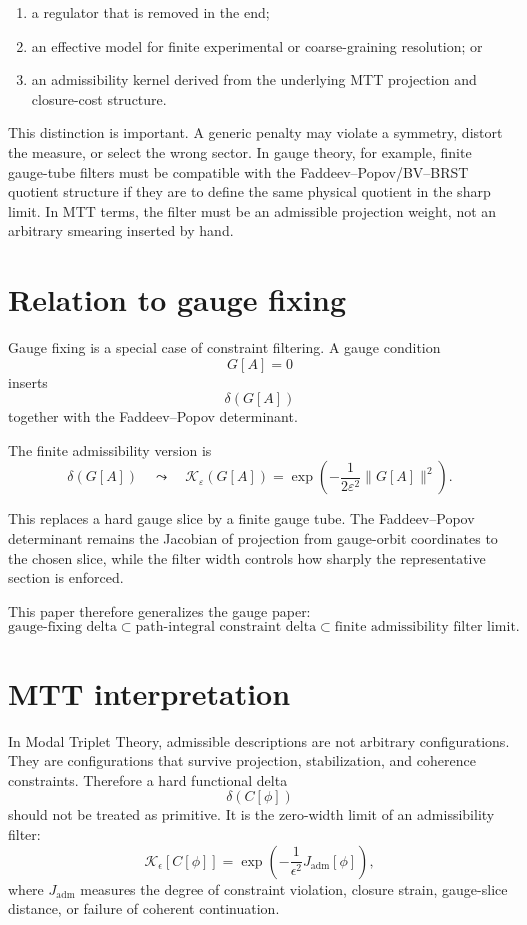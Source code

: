 \documentclass[11pt]{article}
\begin{document}
\begin{enumerate}
\item a regulator that is removed in the end;
\item an effective model for finite experimental or coarse-graining resolution; or
\item an admissibility kernel derived from the underlying MTT projection and closure-cost
structure.
\end{enumerate}

This distinction is important.  A generic penalty may violate a symmetry, distort the measure,
or select the wrong sector.  In gauge theory, for example, finite gauge-tube filters must be
compatible with the Faddeev--Popov/BV--BRST quotient structure if they are to define the
same physical quotient in the sharp limit.  In MTT terms, the filter must be an admissible
projection weight, not an arbitrary smearing inserted by hand.


\section{Relation to gauge fixing}

Gauge fixing is a special case of constraint filtering.  A gauge condition
\[
G[A]=0
\]
inserts
\[
\delta(G[A])
\]
together with the Faddeev--Popov determinant.

The finite admissibility version is
\[
\delta(G[A])
\quad\leadsto\quad
\mathcal K_\varepsilon(G[A])
=
\exp\!\left(-\frac{1}{2\varepsilon^2}\|G[A]\|^2\right).
\]

This replaces a hard gauge slice by a finite gauge tube.  The Faddeev--Popov determinant
remains the Jacobian of projection from gauge-orbit coordinates to the chosen slice, while
the filter width controls how sharply the representative section is enforced.

This paper therefore generalizes the gauge paper:
\[
\text{gauge-fixing delta}
\subset
\text{path-integral constraint delta}
\subset
\text{finite admissibility filter limit}.
\]

\section{MTT interpretation}

In Modal Triplet Theory, admissible descriptions are not arbitrary configurations.  They are
configurations that survive projection, stabilization, and coherence constraints.  Therefore
a hard functional delta
\[
\delta(C[\phi])
\]
should not be treated as primitive.  It is the zero-width limit of an admissibility filter:
\[
\mathcal K_{\epsilon}[C[\phi]]
=
\exp\!\left(-\frac{1}{\epsilon^2}J_{\mathrm{adm}}[\phi]\right),
\]
where \(J_{\mathrm{adm}}\) measures the degree of constraint violation, closure strain, gauge-slice
distance, or failure of coherent continuation.
\end{document}

